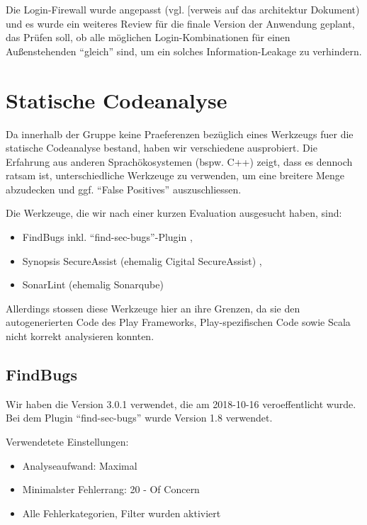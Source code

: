 \documentclass[12pt,DIV14,BCOR10mm,a4paper,twoside,parskip=half-,headsepline,headinclude,english,ngerman,bibliography=totocnumbered]{scrreprt}
\begin{document}
Die Login-Firewall wurde angepasst (vgl. [verweis auf das architektur Dokument) und es wurde ein weiteres Review für die finale Version der Anwendung geplant, das Prüfen soll, ob alle möglichen Login-Kombinationen für einen Außenstehenden ``gleich'' sind, um ein solches Information-Leakage zu verhindern.

\section{Statische Codeanalyse}

Da innerhalb der Gruppe keine Praeferenzen bezüglich eines Werkzeugs fuer die statische Codeanalyse bestand, haben wir verschiedene ausprobiert.
Die Erfahrung aus anderen Sprachökosystemen (bspw. C++) zeigt, dass es dennoch ratsam ist, unterschiedliche Werkzeuge zu verwenden, um eine breitere Menge abzudecken und ggf. \enquote{False Positives} auszuschliessen.

Die Werkzeuge, die wir nach einer kurzen Evaluation ausgesucht haben, sind:

\begin{itemize}
  \item FindBugs \autocite{FindBugs} inkl. \enquote{find-sec-bugs}-Plugin \autocite{FindBugs.FindSecBugs},
  \item Synopsis SecureAssist (ehemalig Cigital SecureAssist) \autocite{SecureAssist},
  \item SonarLint (ehemalig Sonarqube) \autocite{SonarLint}
\end{itemize}

Allerdings stossen diese Werkzeuge hier an ihre Grenzen, da sie den autogenerierten Code des Play Frameworks, Play-spezifischen Code sowie Scala nicht korrekt analysieren konnten.

\subsection{FindBugs}

Wir haben die Version 3.0.1 verwendet, die am 2018-10-16 veroeffentlicht wurde.
Bei dem Plugin \enquote{find-sec-bugs} wurde Version 1.8 verwendet.

Verwendetete Einstellungen:

\begin{itemize}
  \item Analyseaufwand: Maximal
  \item Minimalster Fehlerrang: 20 - Of Concern
  \item Alle Fehlerkategorien, Filter wurden aktiviert
\end{itemize}
\end{document}
